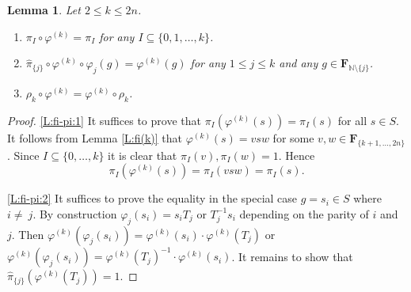 \documentclass[12pt,reqno,a4paper]{article}
\newtheorem{lemma}[theorem]{Lemma}
\theoremstyle{definition}
\theoremstyle{remark}
\numberwithin{equation}{section}
\numberwithin{figure}{section}
\newcommand{\B}[1]{{\mathbf #1}}
\begin{document}
\begin{lemma}\label{L:fi-pi}
Let $2\leq k\leq 2n$.
\begin{enumerate}[label=(\arabic*)]
\item \label{L:fi-pi:1}
$\pi_I\circ \varphi^{(k)}=\pi_I$ for any $I\subseteq\{0,1,\ldots,k\}$.
\item \label{L:fi-pi:2}
$\widehat{\pi}_{\{j\}}\circ\varphi^{(k)}\circ\varphi_j(g)=\varphi^{(k)}(g)$ for
any $1\leq j\leq k$ and any $g \in \B F_{\mathbb N\setminus\{j\}}$.
\item \label{L:fi-pi:3}
$\rho_k\circ\varphi^{(k)} = \varphi^{(k)}\circ \rho_k$.
\end{enumerate}
\end{lemma}
\begin{proof}
\ref{L:fi-pi:1} 
It suffices to prove that $\pi_I(\varphi^{(k)}(s))= \pi_I(s)$ for all $s \in S$.
It follows from Lemma \ref{L:fi(k)} that $\varphi^{(k)}(s) = vsw$ for some $v,w\in \B F_{\{k+1,\ldots,2n\}}$. 
Since
$I\subseteq\{0,\ldots,k\}$ it is clear that $\pi_I(v),\pi_I(w)=1$.
Hence
$$
\pi_I(\varphi^{(k)}(s))=\pi_I(vsw) = \pi_I(s).
$$

\noindent
\ref{L:fi-pi:2}
It suffices to prove the equality in the special case $g=s_i \in S$ where $i \neq~j$.
By construction $\varphi_j(s_i) = s_iT_j$ or $T_j^{-1}s_i$ depending on the parity of $i$ and $j$. 
Then $\varphi^{(k)}(\varphi_j(s_i))=\varphi^{(k)}(s_i) \cdot \varphi^{(k)}(T_j)$ or $\varphi^{(k)}(\varphi_j(s_i))= \varphi^{(k)}(T_j)^{-1} \cdot \varphi^{(k)}(s_i)$.
It remains to show that $\widehat{\pi}_{\{j\}}(\varphi^{(k)}(T_j))=1$.


\end{proof}
\end{document}
